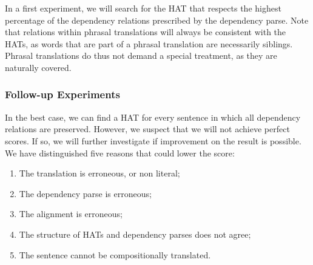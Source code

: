 \documentclass[a4paper, 11pt]{report}
\theoremstyle{definition}
\theoremstyle{plain}
\begin{document}
In a first experiment, we will search for the HAT that respects the highest percentage of the dependency relations prescribed by the dependency parse. Note that relations within phrasal translations will always be consistent with the HATs, as words that are part of a phrasal translation are necessarily siblings. Phrasal translations do thus not demand a special treatment, as they are naturally covered.

\subsubsection{Follow-up Experiments}


In the best case, we can find a HAT for every sentence in which all dependency relations are preserved. However, we suspect that we will not achieve perfect scores. If so, we will further investigate if improvement on the result is possible. We have distinguished five reasons that could lower the score:

\begin{enumerate}
\item The translation is erroneous, or non literal;
\item The dependency parse is erroneous;
\item The alignment is erroneous;
\item The structure of HATs and dependency parses does not agree;
\item The sentence cannot be compositionally translated.
\end{enumerate}
\end{document}
